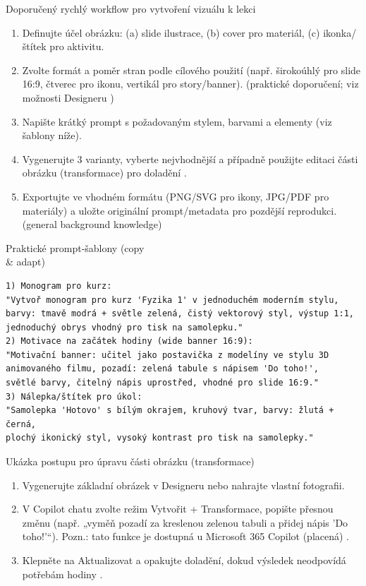 \documentclass{report}%
\begin{document}
Doporučený rychlý workflow pro vytvoření vizuálu k lekci
\begin{enumerate}
  \item Definujte účel obrázku: (a) slide ilustrace, (b) cover pro materiál, (c) ikonka/štítek pro aktivitu.
  \item Zvolte formát a poměr stran podle cílového použití (např. širokoúhlý pro slide 16:9, čtverec pro ikonu, vertikál pro story/banner). (praktické doporučení; viz možnosti Designeru \cite{kb_ai_101_tipu_pdf_04e4a115_page_51_1})
  \item Napište krátký prompt s požadovaným stylem, barvami a elementy (viz šablony níže).
  \item Vygenerujte 3 varianty, vyberte nejvhodnější a případně použijte editaci části obrázku (transformace) pro doladění \cite{kb_ai_101_tipu_pdf_04e4a115_page_52_2}.
  \item Exportujte ve vhodném formátu (PNG/SVG pro ikony, JPG/PDF pro materiály) a uložte originální prompt/metadata pro pozdější reprodukci. (general background knowledge)
\end{enumerate}

Praktické prompt‑šablony (copy \\ \& adapt)
\begin{verbatim}
1) Monogram pro kurz:
"Vytvoř monogram pro kurz 'Fyzika 1' v jednoduchém moderním stylu,
barvy: tmavě modrá + světle zelená, čistý vektorový styl, výstup 1:1,
jednoduchý obrys vhodný pro tisk na samolepku."
2) Motivace na začátek hodiny (wide banner 16:9):
"Motivační banner: učitel jako postavička z modelíny ve stylu 3D
animovaného filmu, pozadí: zelená tabule s nápisem 'Do toho!',
světlé barvy, čitelný nápis uprostřed, vhodné pro slide 16:9."
3) Nálepka/štítek pro úkol:
"Samolepka 'Hotovo' s bílým okrajem, kruhový tvar, barvy: žlutá + černá,
plochý ikonický styl, vysoký kontrast pro tisk na samolepky."
\end{verbatim}

Ukázka postupu pro úpravu části obrázku (transformace)
\begin{enumerate}
  \item Vygenerujte základní obrázek v Designeru nebo nahrajte vlastní fotografii.
  \item V Copilot chatu zvolte režim Vytvořit + Transformace, popište přesnou změnu (např. „vyměň pozadí za kreslenou zelenou tabuli a přidej nápis 'Do toho!'“). Pozn.: tato funkce je dostupná u Microsoft 365 Copilot (placená) \cite{kb_ai_101_tipu_pdf_04e4a115_page_52_2}.
  \item Klepněte na Aktualizovat a opakujte doladění, dokud výsledek neodpovídá potřebám hodiny \cite{kb_ai_101_tipu_pdf_04e4a115_page_52_2}.
\end{enumerate}
\end{document}
